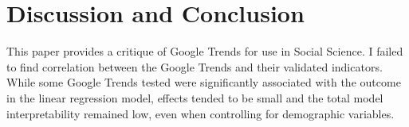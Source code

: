 


\section{Discussion and Conclusion}






This paper provides a critique of Google Trends for use in Social Science. 
I failed to find correlation between the Google Trends and their 
validated indicators. While some Google Trends tested were significantly 
associated with the outcome in the linear regression model, effects tended
to be small and the total model interpretability remained low, even when 
controlling for demographic variables.  

